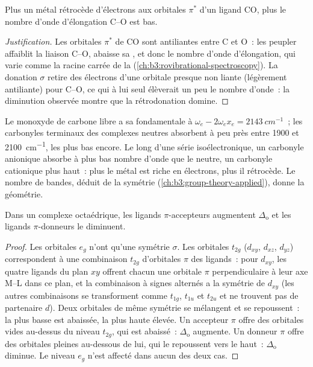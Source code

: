 \begin{proposition}\label{prop:b3:organometallic-bonding:co-frequency}
Plus un métal rétrocède d'électrons aux orbitales $\pi^*$ d'un ligand CO,
plus le nombre d'onde d'élongation C--O est bas.
\end{proposition}

\begin{proof}[Justification]
Les orbitales $\pi^*$ de CO sont antiliantes entre C et O~: les peupler
affaiblit la liaison C--O, abaisse sa , et donc le nombre
d'onde d'élongation, qui varie comme la racine carrée de la  (\cref{ch:b3:rovibrational-spectroscopy}). La donation
$\sigma$ retire des électrons d'une orbitale presque non liante (légèrement
antiliante) pour C--O, ce qui à lui seul élèverait un peu le nombre
d'onde~: la diminution observée montre que la rétrodonation domine.
\end{proof}

Le monoxyde de carbone libre a sa fondamentale à $\omega_e - 2\omega_ex_e = \qty{2143}{cm^{-1}}$~; les carbonyles
terminaux des complexes neutres absorbent à peu près entre 1900 et
\qty{2100}{cm^{-1}}, les  plus bas encore. Le long d'une
série isoélectronique, un carbonyle anionique absorbe à plus bas nombre
d'onde que le neutre, un carbonyle cationique plus haut~: plus le métal est
riche en électrons, plus il rétrocède. Le nombre de bandes, déduit de la
symétrie (\cref{ch:b3:group-theory-applied}), donne la géométrie.

\begin{proposition}\label{prop:b3:organometallic-bonding:pi-delta}
Dans un complexe octaédrique, les ligands $\pi$-accepteurs augmentent $\Delta_{\mathrm o}$ et les ligands $\pi$-donneurs
le diminuent.
\end{proposition}

\begin{proof}
Les orbitales $e_g$ n'ont qu'une symétrie $\sigma$. Les orbitales $t_{2g}$ ($d_{xy}$, $d_{xz}$, $d_{yz}$) correspondent à une
combinaison $t_{2g}$ d'orbitales $\pi$ des ligands~: pour $d_{xy}$, les quatre ligands du plan $xy$
offrent chacun une orbitale $\pi$ perpendiculaire à leur axe M--L dans ce
plan, et la combinaison à signes alternés a la symétrie de $d_{xy}$ (les autres
combinaisons se transforment comme $t_{1g}$, $t_{1u}$ et $t_{2u}$ et ne trouvent pas de partenaire $d$). Deux orbitales de
même symétrie se mélangent et se repoussent~: la plus basse est abaissée,
la plus haute élevée. Un
accepteur $\pi$ offre des orbitales vides au-dessus du niveau $t_{2g}$, qui est abaissé~: $\Delta_{\mathrm o}$
augmente. Un donneur $\pi$ offre des orbitales pleines au-dessous de lui, qui le repoussent vers le haut~: $\Delta_{\mathrm o}$
diminue. Le niveau $e_g$ n'est affecté dans aucun des deux cas.
\end{proof}

